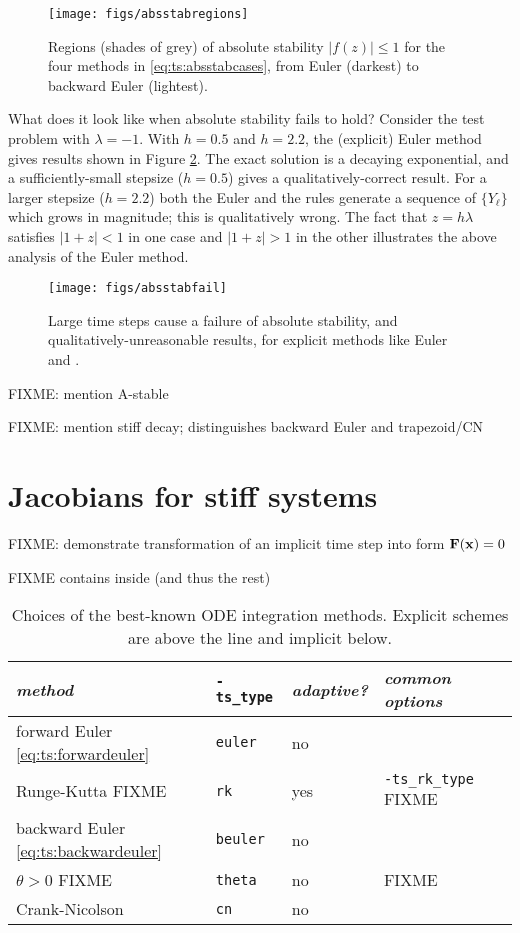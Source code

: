 \begin{figure}
\texttt{[image: figs/absstabregions]}
\caption{Regions (shades of grey) of absolute stability $|f(z)|\le 1$ for the four methods in \eqref{eq:ts:absstabcases}, from Euler (darkest) to backward Euler (lightest).}
\label{fig:ts:absstabregions}
\end{figure}

What does it look like when absolute stability fails to hold?  Consider the test problem with $\lambda=-1$.  With $h=0.5$ and $h=2.2$, the (explicit) Euler method gives results shown in Figure \ref{fig:ts:absstabfail}.  The exact solution is a decaying exponential, and a sufficiently-small stepsize ($h=0.5$) gives a qualitatively-correct result.  For a larger stepsize ($h=2.2$) both the Euler and the \RKtwoa rules generate a sequence of $\{Y_\ell\}$ which grows in magnitude; this is qualitatively wrong.  The fact that $z=h\lambda$ satisfies $|1+z|<1$ in one case and $|1+z|>1$ in the other illustrates the above analysis of the Euler method.

\begin{figure}
\texttt{[image: figs/absstabfail]}
\caption{Large time steps cause a failure of absolute stability, and qualitatively-unreasonable results, for explicit methods like Euler and \RKtwoa.}
\label{fig:ts:absstabfail}
\end{figure}


FIXME: mention A-stable

FIXME: mention stiff decay; distinguishes backward Euler and trapezoid/CN



\section{Jacobians for stiff systems}

FIXME: demonstrate transformation of an implicit time step into form $\mathbf{F}(\mathbf{x})=0$

FIXME \pTS contains \pSNES inside (and thus the rest)

\begin{table}
\small
\begin{tabular}{lllll}
\emph{method}                                & \texttt{-ts\_type} & \emph{adaptive?} & \emph{common options} \\ \hline
forward Euler \eqref{eq:ts:forwardeuler}    & \texttt{euler}  & no & \\
Runge-Kutta  FIXME                          & \texttt{rk}     & yes & \texttt{-ts\_rk\_type} FIXME \\ \hline
backward Euler \eqref{eq:ts:backwardeuler}  & \texttt{beuler} & no & \\
$\theta>0$   FIXME                          & \texttt{theta}  & no & FIXME \\
Crank-Nicolson                              & \texttt{cn}     & no & 
\end{tabular}
\caption{Choices of the best-known ODE integration methods.  Explicit schemes are above the line and implicit below.} \label{tab:ts:odebasictypes}
\end{table}

